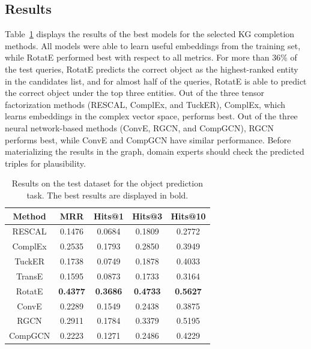 \documentclass[
]{ceurart}
\begin{document}
\subsection{Results}
Table~\ref{tab:results} displays the results of the best models for the selected KG completion methods. All models were able to learn useful embeddings from the training set, while RotatE performed best with respect to all metrics. For more than $36\%$ of the test queries, RotatE predicts the correct object as the highest-ranked entity in the candidates list, and for almost half of the queries, RotatE is able to predict the correct object under the top three entities. Out of the three tensor factorization methods (RESCAL, ComplEx, and TuckER), ComplEx, which learns embeddings in the complex vector space, performs best. Out of the three neural network-based methods (ConvE, RGCN, and CompGCN), RGCN performs best, while ConvE and CompGCN have similar performance. Before materializing the results in the graph, domain experts should check the predicted triples for plausibility.
\begin{table}
\caption{Results on the test dataset for the object prediction task. The best results are displayed in bold.}
\begin{center}
\addtolength{\tabcolsep}{2pt}
\begin{tabular}{|c | c c c c|}
\hline
Method & MRR & Hits@1 & Hits@3 & Hits@10\\
\hline
RESCAL & 0.1476 & 0.0684& 0.1809 & 0.2772 \\
ComplEx & 0.2535 & 0.1793 & 0.2850 & 0.3949\\
TuckER & 0.1738 & 0.0749 & 0.1878 & 0.4033\\
TransE & 0.1595 & 0.0873& 0.1733 & 0.3164 \\
RotatE & \textbf{0.4377} & \textbf{0.3686} & \textbf{0.4733} & \textbf{0.5627} \\
ConvE & 0.2289 & 0.1549 & 0.2438 & 0.3875 \\
RGCN & 0.2911 & 0.1784 & 0.3379 & 0.5195\\
CompGCN & 0.2223 & 0.1271 & 0.2486 & 0.4229\\
\hline
\end{tabular}
\label{tab:results}
\end{center}
\end{table}
\end{document}
